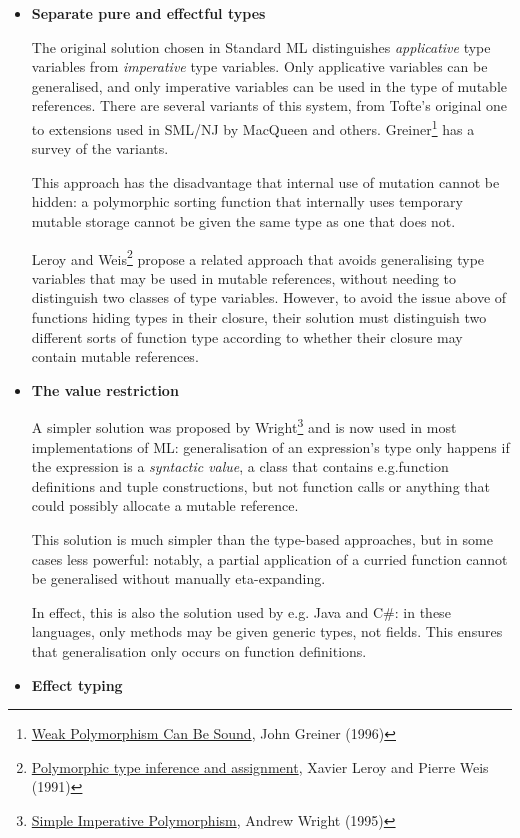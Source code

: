 \documentclass[11pt,oneside]{article}
\newenvironment{ceitemize}{\begin{itemize}}{\end{itemize}}
\begin{document}
\begin{ceitemize}
\item \textbf{Separate pure and effectful types}

The original solution chosen in Standard ML distinguishes \emph{applicative} type variables from \emph{imperative} type variables. Only applicative variables can be generalised, and only imperative variables can be used in the type of mutable references. There are several variants of this system, from Tofte's original one to extensions used in SML/NJ by MacQueen and others. Greiner\footnote{\href{https://citeseerx.ist.psu.edu/viewdoc/summary?doi=10.1.1.37.5096&rank=1}{Weak Polymorphism Can Be Sound}, John Greiner (1996)} has a survey of the variants.

This approach has the disadvantage that internal use of mutation cannot be hidden: a polymorphic sorting function that internally uses temporary mutable storage cannot be given the same type as one that does not.

Leroy and Weis\footnote{\href{https://hal.inria.fr/hal-01499974/}{Polymorphic type inference and assignment}, Xavier Leroy and Pierre Weis (1991)} propose a related approach that avoids generalising type variables that may be used in mutable references, without needing to distinguish two classes of type variables.  However, to avoid the issue above of functions hiding types in their closure, their solution must distinguish two different sorts of function type according to whether their closure may contain mutable references.
\item \textbf{The value restriction}

A simpler solution was proposed by Wright\footnote{\href{https://citeseerx.ist.psu.edu/viewdoc/summary?doi=10.1.1.37.5096&rank=1}{Simple Imperative Polymorphism}, Andrew Wright (1995)} and is now used in most implementations of ML: generalisation of an expression's type only happens if the expression is a \emph{syntactic value}, a class that contains e.g.\@  function definitions and tuple constructions, but not function calls or anything that could possibly allocate a mutable reference.

This solution is much simpler than the type-based approaches, but in some cases less powerful: notably, a partial application of a curried function cannot be generalised without manually eta-expanding.

In effect, this is also the solution used by e.g. Java and C\#: in these languages, only methods may be given generic types, not fields. This ensures that generalisation only occurs on function definitions.
\item \textbf{Effect typing}


\end{ceitemize}
\end{document}
